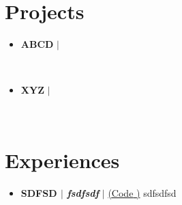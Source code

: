 \documentclass[letterpaper,5pt]{article}
\begin{document}
        
    
    \section{Projects}
    
        \begin{itemize}[leftmargin=0.15in,label={}]
        
          \item{
            \textbf{ABCD} $|$  
            \hfill 
          }
            \begin{itemize}
            \vspace{-5pt}
             
            \vspace{-5pt}
                 
            \   
            \end{itemize}
          
          \item{
            \textbf{XYZ} $|$  
            \hfill 
          }
            \begin{itemize}
            \vspace{-5pt}
             
            \vspace{-5pt}
                 
            \   
            \end{itemize}
          
          
      \end{itemize}
      \vspace*{-6mm}  
        


    
      
        \section{Experiences}
        \begin{itemize}[leftmargin=0.15in,label={}]
        
            \item[]
            \textbf{SDFSD $|$ \emph{fsdfsdf}} $|$ \href{sdfds}{({Code} \faExternalLink)} \hfill sdfsdfsd
            \begin{itemize}
              \vspace{-5pt}
              
              \vspace{-5pt}
                           
            \end{itemize}
      \end{itemize}
      
    
    
    
    
      
\end{document}
